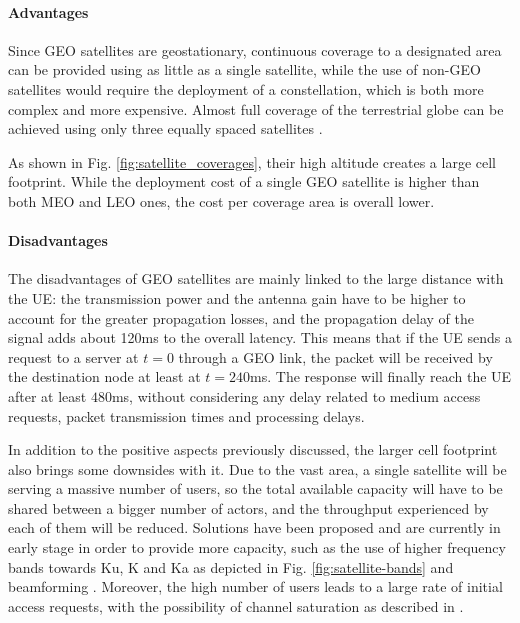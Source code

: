 \paragraph{Advantages}    
Since \ac{GEO} satellites are geostationary, continuous coverage to a designated area can be provided using as little as a single satellite, while the use of non-\ac{GEO} satellites would require the deployment of a constellation, which is both more complex and more expensive. Almost full coverage of the terrestrial globe can be achieved using only three equally spaced satellites \cite{types-of-orbits-esa}.

As shown in Fig. \ref{fig:satellite_coverages}, their high altitude creates a large cell footprint. While the deployment cost of a single \ac{GEO} satellite is higher than both \ac{MEO} and \ac{LEO} ones, the cost per coverage area is overall lower.

\paragraph{Disadvantages}
The disadvantages of \ac{GEO} satellites are mainly linked to the large distance with the \ac{UE}: the transmission power and the antenna gain have to be higher to account for the greater propagation losses, and the propagation delay of the signal adds about 120ms to the overall latency. This means that if the \ac{UE} sends a request to a server at $t=0$ through a \ac{GEO} link, the packet will be received by the destination node at least at $t=240$ms. The response will finally reach the \ac{UE} after at least $480$ms, without considering any delay related to medium access requests, packet transmission times and processing delays.

In addition to the positive aspects previously discussed, the larger cell footprint also brings some downsides with it. Due to the vast area, a single satellite will be serving a massive number of users, so the total available capacity will have to be shared between a bigger number of actors, and the throughput experienced by each of them will be reduced. Solutions have been proposed and are currently in early stage in order to provide more capacity, such as the use of higher frequency bands towards Ku, K and Ka as depicted in Fig. \ref{fig:satellite-bands} and beamforming \cite{advances-comm-sat-sys}.
Moreover, the high number of users leads to a large rate of initial access requests, with the possibility of channel saturation as described in \cite{3gpp-tr-38.811}.

